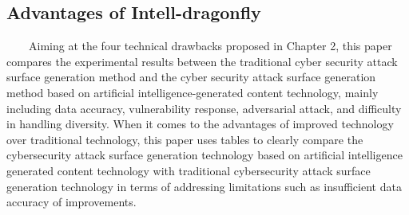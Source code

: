 \documentclass[runningheads]{llncs}
\begin{document}
\subsection{Advantages of Intell-dragonfly}
\ \ \ \ Aiming at the four technical drawbacks proposed in Chapter 2, this paper compares the experimental results between the traditional cyber security attack surface generation method and the cyber security attack surface generation method based on artificial intelligence-generated content technology, mainly including data accuracy, vulnerability response, adversarial attack, and difficulty in handling diversity. When it comes to the advantages of improved technology over traditional technology, this paper uses tables to clearly compare the cybersecurity attack surface generation technology based on artificial intelligence generated content technology with traditional cybersecurity attack surface generation technology in terms of addressing limitations such as insufficient data accuracy of improvements.\par
%
\vspace{-1em}
\end{document}
